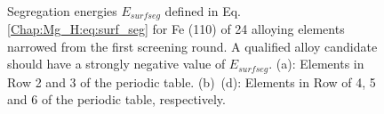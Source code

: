 \begingroup
\begin{figure}[!ht]
  \centering
  \label{Chap:Mg_H:fig:7a}
  \label{Chap:Mg_H:fig:7b}
  \\
  \label{Chap:Mg_H:fig:7c}
  \label{Chap:Mg_H:fig:7d}
\caption[Surface segregation energies for Fe (110) of 24 alloying elements]{Segregation energies $E_{surf seg}$ defined in Eq. \ref{Chap:Mg_H:eq:surf_seg} for Fe (110) of 24 alloying elements narrowed from the first screening round. A qualified alloy candidate should have a strongly negative value of $E_{surf seg}$. (a): Elements in Row 2 and 3 of the periodic table. (b)~(d): Elements in Row of 4, 5 and 6 of the periodic table, respectively.}
  \label{Chap:Mg_H:fig7}
\end{figure}
\endgroup


